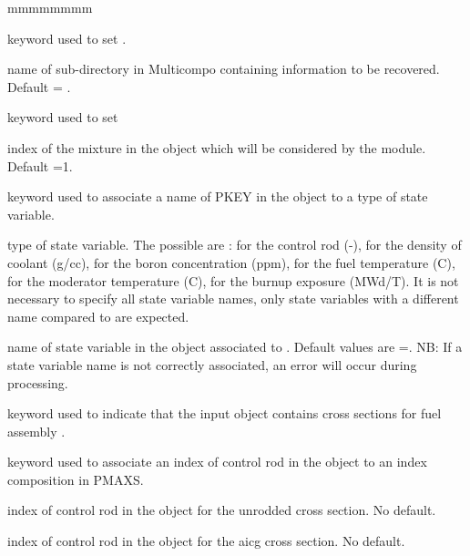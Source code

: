 \begin{ListeDeDescription}{mmmmmmmm}

\item[\moc{NAMDIR}] keyword used to set   .

\item[\dusa{mixdir}] name of sub-directory in Multicompo containing information to be recovered.  Default  = .

\item[\moc{MIX}]keyword used to set 

\item[\dusa{imix}] index of the mixture in the  object which will be considered by the module. Default =1.

\item[\moc{PKEY}]  keyword used to associate a name of PKEY in the  object to a type of state variable.

\item[\dusa{refnam}]  type of state variable. The possible  are :   for the control rod (-),  for the density of coolant (g/cc),  for the boron concentration (ppm),   for the fuel temperature (C),  for the moderator temperature (C),   for the burnup exposure (MWd/T). It is not necessary to specify all state variable names, only state variables with a different name compared to  are expected.

\item[\dusa{sapnam}]  name of state variable in the  object associated to  . Default values are =. NB: If a state variable name is not correctly associated, an error will occur during processing.

\item[\moc{FUEL}] keyword used to indicate that the input  object contains cross sections for fuel assembly .

\item[\moc{BARR}]  keyword used to associate an index of control rod in the  object to an index composition in PMAXS.

\item[\dusa{unrodded}] index of control rod in the  object for the unrodded cross section. No default.

\item[\dusa{aicg}] index of control rod in the  object for the aicg cross section. No default.


\end{ListeDeDescription}
